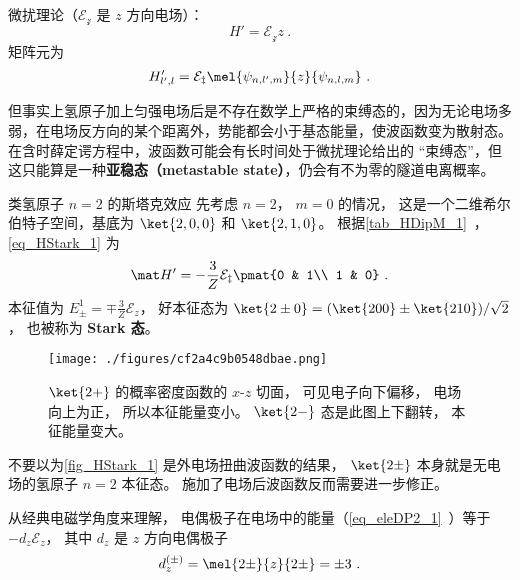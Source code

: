
\begin{issues}
\issueDraft
\end{issues}


微扰理论（$\mathcal{E_z}$ 是 $z$ 方向电场）：
\begin{equation}
H' = \mathcal{E_z} z~.
\end{equation}
矩阵元为
\begin{equation}\label{eq_HStark_1}
H'_{l',l} = \mathcal{E_z}\mel{\psi_{n,l',m}}{z}{\psi_{n,l,m}}~.
\end{equation}

但事实上氢原子加上匀强电场后是不存在数学上严格的束缚态的，因为无论电场多弱，在电场反方向的某个距离外，势能都会小于基态能量，使波函数变为散射态。在含时薛定谔方程中，波函数可能会有长时间处于微扰理论给出的 “束缚态”，但这只能算是一种\textbf{亚稳态（metastable state）}，仍会有不为零的隧道电离概率。

\begin{example}{类氢原子 $n=2$ 的斯塔克效应}
先考虑 $n=2$， $m=0$ 的情况， 这是一个二维希尔伯特子空间，基底为 $\ket{2,0,0}$ 和 $\ket{2,1,0}$。 根据\autoref{tab_HDipM_1}~， \autoref{eq_HStark_1} 为
\begin{equation}
\mat H' = -\frac{3}{Z}\mathcal{E_z}\pmat{0 & 1\\ 1 & 0}~.
\end{equation}
本征值为 $E_{\pm}^1 = \mp \frac{3}{Z}\mathcal{E}_z$， 好本征态为 $\ket{2\pm 0} = (\ket{200} \pm \ket{210})/{\sqrt 2}$， 也被称为 \textbf{Stark 态}。

\begin{figure}[ht]
\centering
\texttt{[image: ./figures/cf2a4c9b0548dbae.png]}
\caption{$\ket{2+}$ 的概率密度函数的 $x$-$z$ 切面， 可见电子向下偏移， 电场向上为正， 所以本征能量变小。 $\ket{2-}$ 态是此图上下翻转， 本征能量变大。} \label{fig_HStark_1}
\end{figure}

不要以为\autoref{fig_HStark_1} 是外电场扭曲波函数的结果， $\ket{2\pm}$ 本身就是无电场的氢原子 $n=2$ 本征态。 施加了电场后波函数反而需要进一步修正。

从经典电磁学角度来理解， 电偶极子在电场中的能量（\autoref{eq_eleDP2_1}~）等于 $-d_z \mathcal{E}_z$， 其中 $d_z$ 是 $z$ 方向电偶极子
\begin{equation}
d_z^{(\pm)} = \mel{2\pm}{z}{2\pm} = \pm 3~.
\end{equation}
\end{example}

